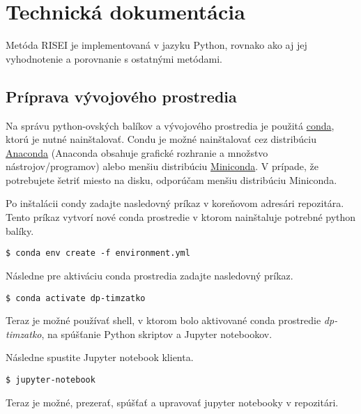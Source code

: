 \chapter{Technická dokumentácia \label{cha:technical_documentation}}

\setcounter{page}{1}

Metóda RISEI je implementovaná v jazyku Python, rovnako ako aj jej vyhodnotenie
a porovnanie s ostatnými metódami.

\section{Príprava vývojového prostredia}

Na správu python-ovských balíkov a vývojového prostredia je použitá \href{https://docs.conda.io/projects/conda/en/latest/index.html}{conda}, ktorú je nutné nainštalovať. Condu je možné nainštalovať cez distribúciu \href{https://www.anaconda.com/anaconda/}{Anaconda} (Anaconda obsahuje grafické rozhranie a množstvo nástrojov/programov) alebo menšiu distribúciu \href{https://docs.conda.io/en/latest/miniconda.html}{Miniconda}. V prípade, že potrebujete šetriť miesto na disku, odporúčam menšiu distribúciu Miniconda.

Po inštalácii condy zadajte nasledovný príkaz v koreňovom adresári repozitára. Tento príkaz vytvorí nové conda prostredie v ktorom nainštaluje potrebné python balíky.

\begin{lstlisting}[style=BashInputStyle]
    $ conda env create -f environment.yml
\end{lstlisting}

Následne pre aktiváciu conda prostredia zadajte nasledovný príkaz.

\begin{lstlisting}[style=BashInputStyle]
    $ conda activate dp-timzatko
\end{lstlisting}

Teraz je možné používať shell, v ktorom bolo aktivované conda prostredie \textit{dp-timzatko}, na spúšťanie Python skriptov a Jupyter notebookov.

Následne spustite Jupyter notebook klienta.

\begin{lstlisting}[style=BashInputStyle]
    $ jupyter-notebook
\end{lstlisting}

Teraz je možné, prezerať, spúšťať a upravovať jupyter notebooky v repozitári.

